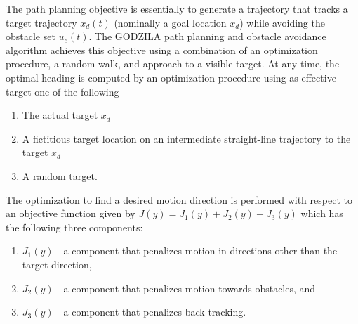 The path planning objective is essentially to generate a trajectory that tracks a target trajectory $x_d (t)$ (nominally a goal location $x_d$) while avoiding the obstacle set $u_e(t)$. The GODZILA path planning and obstacle avoidance algorithm \cite{KK05b_jirs} achieves this objective using a combination of an optimization procedure, a random walk, and approach to a visible target.  At any time, the optimal heading is computed by an optimization procedure using as effective target one of the following

\begin{enumerate}
\item The actual target $x_d$
\item A fictitious target location on an intermediate straight-line
  trajectory to the target $x_d$
\item A random target. 
\end{enumerate}

The optimization to find a desired motion direction is performed with respect to an objective function given by 
$J(y)=J_1(y)+J_2(y)+J_3(y)$
which has the following three components:

\begin{enumerate}
\item $J_1(y)$ - a component that penalizes motion in directions other than the target direction, 
\item $J_2(y)$ - a component that penalizes motion towards obstacles, and
\item $J_3(y)$ - a component that penalizes back-tracking.
\end{enumerate}

